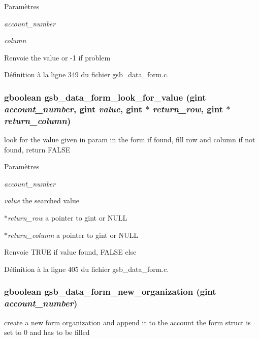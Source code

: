 \begin{DoxyParams}{Paramètres}
\item[{\em account\_\-number}]\item[{\em column}]\end{DoxyParams}
\begin{DoxyReturn}{Renvoie}
the value or -\/1 if problem 
\end{DoxyReturn}


Définition à la ligne 349 du fichier gsb\_\-data\_\-form.c.

\subsubsection[{gsb\_\-data\_\-form\_\-look\_\-for\_\-value}]{\setlength{\rightskip}{0pt plus 5cm}gboolean gsb\_\-data\_\-form\_\-look\_\-for\_\-value (gint {\em account\_\-number}, \/  gint {\em value}, \/  gint $\ast$ {\em return\_\-row}, \/  gint $\ast$ {\em return\_\-column})}\label{gsb__data__form_8c_a011611d3aa6cecc0c619981f69bf2a6e}
look for the value given in param in the form if found, fill row and column if not found, return FALSE


\begin{DoxyParams}{Paramètres}
\item[{\em account\_\-number}]\item[{\em value}]the searched value \item[{\em $\ast$return\_\-row}]a pointer to gint or NULL \item[{\em $\ast$return\_\-column}]a pointer to gint or NULL\end{DoxyParams}
\begin{DoxyReturn}{Renvoie}
TRUE if value found, FALSE else 
\end{DoxyReturn}


Définition à la ligne 405 du fichier gsb\_\-data\_\-form.c.

\subsubsection[{gsb\_\-data\_\-form\_\-new\_\-organization}]{\setlength{\rightskip}{0pt plus 5cm}gboolean gsb\_\-data\_\-form\_\-new\_\-organization (gint {\em account\_\-number})}\label{gsb__data__form_8c_a8e695941eaf64be2d15afd287e064523}
create a new form organization and append it to the account the form struct is set to 0 and has to be filled


